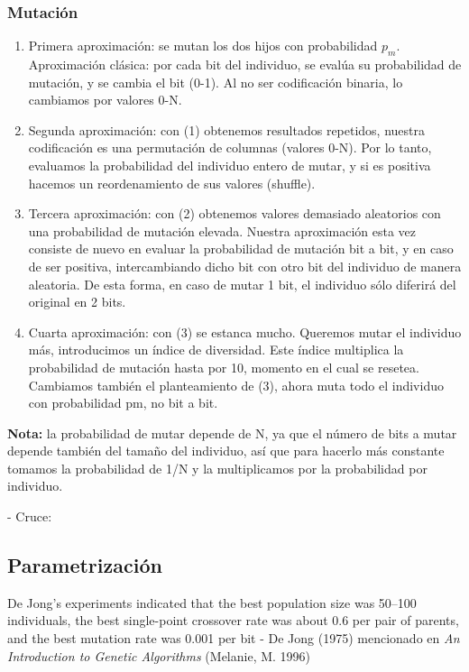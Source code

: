\documentclass[12pt]{article}
\begin{document}
\subsubsection{Mutación}

\begin{enumerate}
    \item Primera aproximación: se mutan los dos hijos con probabilidad $p_m$. Aproximación clásica: por cada bit del individuo, se evalúa su probabilidad de mutación, y se cambia el bit (0-1). Al no ser codificación binaria, lo cambiamos por valores 0-N.
    \item Segunda aproximación: con (1) obtenemos resultados repetidos, nuestra codificación es una permutación de columnas (valores 0-N). Por lo tanto, evaluamos la probabilidad del individuo entero de mutar, y si es positiva hacemos un reordenamiento de sus valores (shuffle).
    \item Tercera aproximación: con (2) obtenemos valores demasiado aleatorios con una probabilidad de mutación elevada. Nuestra aproximación esta vez consiste de nuevo en evaluar la probabilidad de mutación bit a bit, y en caso de ser positiva, intercambiando dicho bit con otro bit del individuo de manera aleatoria. De esta forma, en caso de mutar 1 bit, el individuo sólo diferirá del original en 2 bits.
    \item Cuarta aproximación: con (3) se estanca mucho. Queremos mutar el individuo más, introducimos un índice de diversidad. Este índice multiplica la probabilidad de mutación hasta por 10, momento en el cual se resetea. Cambiamos también el planteamiento de (3), ahora muta todo el individuo con probabilidad pm, no bit a bit.
    
\end{enumerate}
\textbf{Nota:}
la probabilidad de mutar depende de N, ya que el número de bits a mutar depende también del tamaño del individuo, así que para hacerlo más constante tomamos la probabilidad de 1/N y la multiplicamos por la probabilidad por individuo.


- Cruce:


\subsection{Parametrización}

De Jong's experiments indicated that the best population size was 50–100 individuals, the best single-point crossover rate was about 0.6 per pair of parents, and the best mutation rate was 0.001 per bit - De Jong (1975) mencionado en \emph{An Introduction to Genetic Algorithms} (Melanie, M. 1996) 
\end{document}
